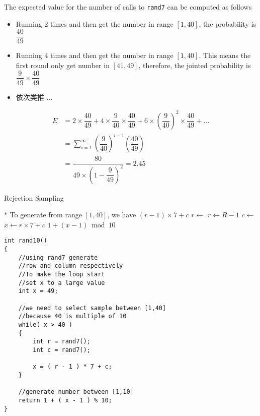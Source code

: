 The expected value for the number of calls to \texttt{rand7} can be computed as follows
\begin{itemize}
\item Running 2 times and then get the number in range $[1, 40]$, the probability is $\dfrac{40}{49}$
\item Running 4 times and then get the number in range $[1, 40]$. This means the first round only get number in $[41,49]$, therefore, the jointed probability is $\dfrac{9}{49}\times\dfrac{40}{49}$
\item  依次类推 $\ldots$  
\end{itemize}

\begin{align*}
E &= 2\times \dfrac{40}{49} + 4\times \dfrac{9}{40} \times \dfrac{40}{49} + 6\times \left(\dfrac{9}{40}\right)^{2} \times \dfrac{40}{49} +\ldots \\
  &= \sum\limits_{i=1}^{\infty}\left(\dfrac{9}{40}\right)^{i-1}\left(\dfrac{40}{49}\right) \\
  & = \dfrac{80}{49\times \left(1-\dfrac{9}{49}\right)^2} = 2.45
\end{align*}

\setcounter{algorithm}{0}
\begin{algorithm}[H]
\caption{Rejection Sampling}
\begin{algorithmic}[1]
\Repeat
\State $\ast$ To generate from range $[1,40]$, we have $(r-1)\times 7 +c$
\State $r \gets$ 
\State $r\gets R-1$
\State $c \gets$ 
\State $x \gets r\times 7 + c$
\State \Return $1+(x-1)\bmod 10$
\EndProcedure
\end{algorithmic}
\end{algorithm}


\setcounter{lstlisting}{0}
\begin{lstlisting}[style=customc, caption={Rejection Sampling}]
int rand10()
{
    //using rand7 generate
    //row and column respectively
    //To make the loop start
    //set x to a large value
    int x = 49;

    //we need to select sample between [1,40]
    //because 40 is multiple of 10
    while( x > 40 )
    {
        int r = rand7();
        int c = rand7();

        x = ( r - 1 ) * 7 + c;
    }

    //generate number between [1,10]
    return 1 + ( x - 1 ) % 10;
}
\end{lstlisting}


